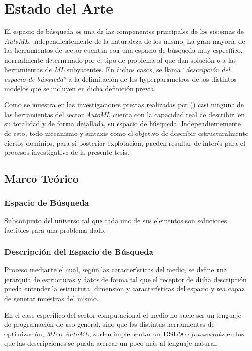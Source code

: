 \chapter{Estado del Arte}\label{chapter:state-of-the-art}


El espacio de búsqueda es una de las componentes principales de los sistemas
de {\it AutoML}, independientemente de la naturaleza de los mismo. La gran mayoría
de las herramientas de sector cuentan con una espacio de búsqueda muy específico,
normalmente determinado por el tipo de problema al que dan solución o a las
herramientas de {\it ML} subyacentes. En dichos casos, se llama ``{\it descripción
del espacio de búsqueda}'' a la delimitación de los hyperparámetros de los
distintos modelos que se incluyen en dicha definición previa

Como se muestra en las investigaciones previas realizadas por (\cite{estevanellhacia}) casi ninguna
de las herramientas del sector {\it AutoML} cuenta con la capacidad real de describir,
en su totalidad y de forma detallada, su espacio de búsqueda. Independientemente
de esto, todo mecanismo y sintaxis como el objetivo de describir estructuralmente
ciertos dominios, para si posterior explotación, pueden resultar de interés para
el procesos investigativo de la presente tesis.

\section{Marco Teórico}

\subsection{Espacio de Búsqueda}

Subconjunto del universo tal que cada uno de sus elementos son soluciones factibles
para una problema dado.

\subsection{Descripción del Espacio de Búsqueda}


Proceso mediante el cual, según las características del medio, se define una
jerarquía de estructuras y datos de forma tal que el receptor de dicha descripción
pueda entender la estructura, dimension y características del espacio y sea capaz
de generar muestras del mismo.

En el caso específico del sector computacional el medio no suele ser un lenguaje
de programación de uso general, sino que las distintas herramientas de optimización,
{\it ML} o {\it AutoML}, suelen implementar un {\bf DSL's} o {\it frameworks} en los
que las descripciones se pueda acercar un poco más al lenguaje natural.

